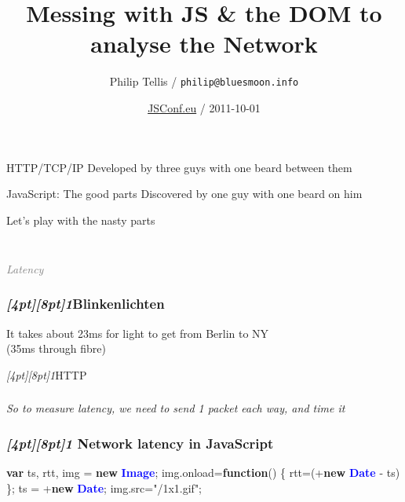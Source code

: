 \documentclass{beamer}
\author{Philip Tellis / \texttt{philip@bluesmoon.info}}
\title{Messing with JS \& the DOM to analyse the Network}
\date{\href{http://jsconf.eu/2011/}{JSConf.eu} / 2011-10-01}
\newcommand{\sn}[1]{\textrm{\textit{\Huge{\raisebox{-3pt}[4pt][8pt]{\textcolor{f2elblue}{#1}}}}}\hspace{4pt}}
\newcommand{\innersplash}[1]{
  \begin{center}
    \large \textrm{\textit{ #1 } }
  \end{center}
}
\newcommand{\splashslide}[2][{}]{
  \begin{frame}
  \frametitle{#1}
  \innersplash{#2}
  \end{frame}
}
\newcommand{\leadinslide}[2]{
  \splashslide{
     {\fontsize{150}{20}\selectfont{\raisebox{0pt}[90pt][0pt]{\textcolor{light-gray}{#1}}}} \\ \huge \textcolor{gray}{#2}
  }
}
\def\green<#1>#2{\textcolor<#1>{dark-green}{\textbf<#1>{#2}}}
\def\blue<#1>#2{\textcolor<#1>{blue}{\textbf<#1>{#2}}}
\begin{document}
\begin{frame}
  \titlepage
\end{frame}


\begin{frame}{HTTP/TCP/IP}
\vspace{-4cm}
Developed by three guys with one beard between them
\end{frame}

\begin{frame}{JavaScript: The good parts}
\vspace{-4cm}
Discovered by one guy with one beard on him
\end{frame}

\begin{frame}
Let's play with the nasty parts
\end{frame}

\leadinslide{1}{Latency}

\begin{frame}
\frametitle{\sn{1}Blinkenlichten}
\vspace{4cm}
\begin{center}
It takes about 23ms for light to get from Berlin to NY \\
(35ms through fibre)
\end{center}
\end{frame}

\begin{frame}{\sn{1}HTTP}
\end{frame}

\splashslide{So to measure latency, we need to send 1 packet each way, and time it}

\begin{frame}[fragile]
\frametitle{\sn{1} Network latency in JavaScript}
\begin{semiverbatim}
  \green<1>{var} ts, rtt, img = \green<1>{new} \blue<1>{Image};
  img.onload=\green<1>{function}() \{ rtt=(+\green<1>{new} \blue<1>{Date} - ts) \};
  ts = +\green<1>{new} \blue<1>{Date};
  img.src="/1x1.gif";
\end{semiverbatim}
\end{frame}
\end{document}
